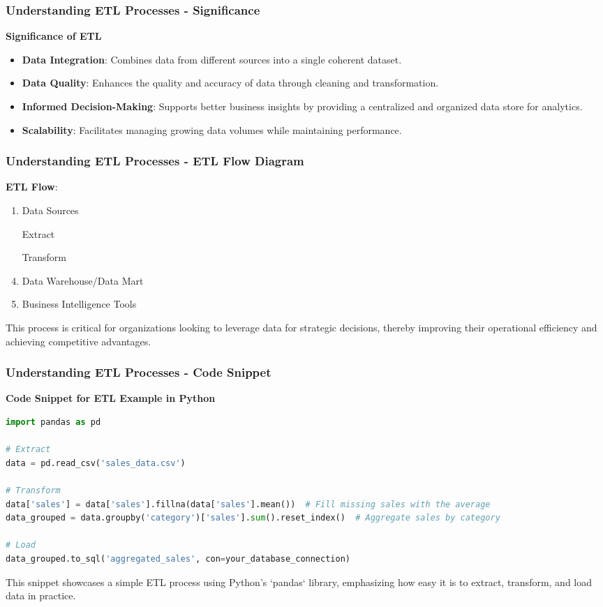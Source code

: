 \documentclass[aspectratio=169]{beamer}
\begin{document}
\begin{frame}[fragile]
    \frametitle{Understanding ETL Processes - Significance}

    \textbf{Significance of ETL}

    \begin{itemize}
        \item \textbf{Data Integration}: Combines data from different sources into a single coherent dataset.
        \item \textbf{Data Quality}: Enhances the quality and accuracy of data through cleaning and transformation.
        \item \textbf{Informed Decision-Making}: Supports better business insights by providing a centralized and organized data store for analytics.
        \item \textbf{Scalability}: Facilitates managing growing data volumes while maintaining performance.
    \end{itemize}
\end{frame}

\begin{frame}[fragile]
    \frametitle{Understanding ETL Processes - ETL Flow Diagram}

    \textbf{ETL Flow}:
    \begin{enumerate}
        \item Data Sources 
        \item [Extract] 
        \item [Transform] 
        \item Data Warehouse/Data Mart 
        \item Business Intelligence Tools
    \end{enumerate}

    This process is critical for organizations looking to leverage data for strategic decisions, thereby improving their operational efficiency and achieving competitive advantages.
\end{frame}

\begin{frame}[fragile]
    \frametitle{Understanding ETL Processes - Code Snippet}

    \textbf{Code Snippet for ETL Example in Python}

    \begin{lstlisting}[language=Python]
import pandas as pd

# Extract
data = pd.read_csv('sales_data.csv')

# Transform
data['sales'] = data['sales'].fillna(data['sales'].mean())  # Fill missing sales with the average
data_grouped = data.groupby('category')['sales'].sum().reset_index()  # Aggregate sales by category

# Load
data_grouped.to_sql('aggregated_sales', con=your_database_connection)
    \end{lstlisting}

    This snippet showcases a simple ETL process using Python's `pandas` library, emphasizing how easy it is to extract, transform, and load data in practice.
\end{frame}
\end{document}
